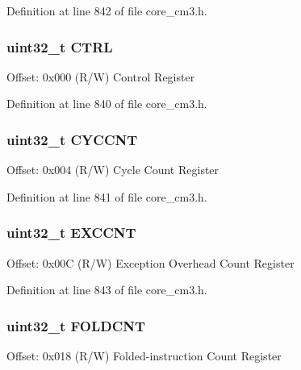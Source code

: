 Definition at line 842 of file core\+\_\+cm3.\+h.

\subsubsection[{\texorpdfstring{C\+T\+RL}{CTRL}}]{ uint32\+\_\+t C\+T\+RL}\hypertarget{struct_d_w_t___type_ac81efc171e9852a36caeb47122bfec5b}{}\label{struct_d_w_t___type_ac81efc171e9852a36caeb47122bfec5b}
Offset\+: 0x000 (R/W) Control Register 

Definition at line 840 of file core\+\_\+cm3.\+h.

\subsubsection[{\texorpdfstring{C\+Y\+C\+C\+NT}{CYCCNT}}]{ uint32\+\_\+t C\+Y\+C\+C\+NT}\hypertarget{struct_d_w_t___type_a14822f5ad3426799332ac537d9293f3c}{}\label{struct_d_w_t___type_a14822f5ad3426799332ac537d9293f3c}
Offset\+: 0x004 (R/W) Cycle Count Register 

Definition at line 841 of file core\+\_\+cm3.\+h.

\subsubsection[{\texorpdfstring{E\+X\+C\+C\+NT}{EXCCNT}}]{ uint32\+\_\+t E\+X\+C\+C\+NT}\hypertarget{struct_d_w_t___type_afe0bbc124e53ad450abc72bfb56bd74f}{}\label{struct_d_w_t___type_afe0bbc124e53ad450abc72bfb56bd74f}
Offset\+: 0x00C (R/W) Exception Overhead Count Register 

Definition at line 843 of file core\+\_\+cm3.\+h.

\subsubsection[{\texorpdfstring{F\+O\+L\+D\+C\+NT}{FOLDCNT}}]{ uint32\+\_\+t F\+O\+L\+D\+C\+NT}\hypertarget{struct_d_w_t___type_a6324c1fbf6c94f1eaf742d09ad678216}{}\label{struct_d_w_t___type_a6324c1fbf6c94f1eaf742d09ad678216}
Offset\+: 0x018 (R/W) Folded-\/instruction Count Register 

